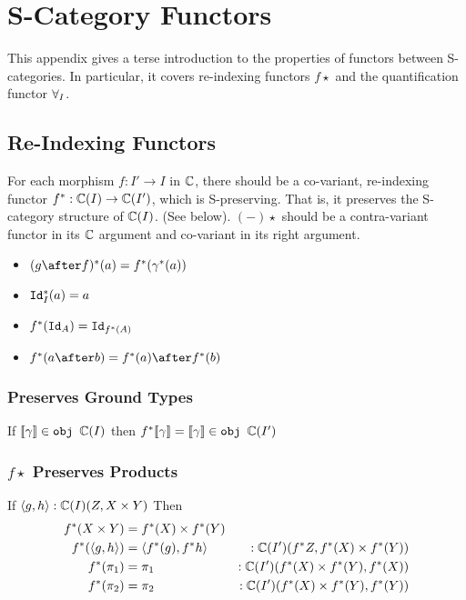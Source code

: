 


\chapter{S-Category Functors}

This appendix gives a terse introduction to the properties of functors between S-categories. In particular, it covers re-indexing functors $f\star$ and the quantification functor $\forall_I$.

\section{Re-Indexing Functors}\label{AppendixReindexingFunctors}
For each morphism $f: I' \rightarrow I$ in $\mathbb{C}$, there should be a co-variant, re-indexing functor  $f^*: \mathbb{C}(I) \rightarrow \mathbb{C}(I')$, which is S-preserving. That is, it preserves the S-category structure of $\mathbb{C}(I)$. (See below). $(-)\star$ should be a contra-variant functor in its $\mathbb{C}$ argument and co-variant in its right argument.

\begin{itemize}
    \item $(g\after f)\star(a) = f\star(\g\star(a))$
    \item $\texttt{Id}_{I}^*(a) = a$
    \item $f^*(\texttt{Id}_{A}) = \texttt{Id}_{f^*(A)}$
    \item $f\star(a\after b) = f\star(a)\after f\star(b)$
\end{itemize}
\subsection{Preserves Ground Types}
If ${\bf [\![}\gamma{\bf ]\!]}\in\texttt{obj }\mathbb{C}(I)$ then $f^*{\bf [\![}\gamma{\bf ]\!]} = {\bf [\![}\gamma{\bf ]\!]}\in\texttt{obj }\mathbb{C}(I')$
\subsection{$f\star$ Preserves Products}
If $\langle g, h\rangle:\mathbb{C}(I)(Z, X\times Y)$
Then 
\begin{align*}
    f^*(X\times Y) & = f^*(X)\times f^*(Y)\\
    f^*(\langle g, h\rangle) & = \langle f^*(g), f^*{h}\rangle&:\mathbb{C}(I')(f^* Z, f^*(X)\times f^*(Y))\\
    f^*(\pi_1) & = \pi_1&:\mathbb{C}(I')(f^*(X)\times f^*(Y), f^*(X)) \\
    f^*(\pi_2) &= \pi_2&:\mathbb{C}(I')(f^*(X)\times f^*(Y), f^*(Y))
\end{align*}

